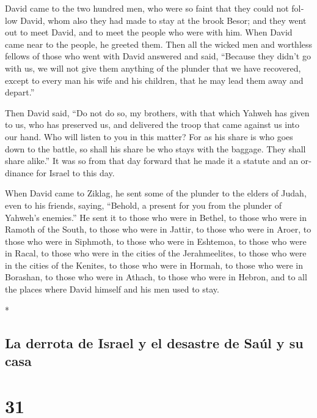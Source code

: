 \begin{paracol}{2}
\begin{otherlanguage}{english}
 David came to the two hundred men, who were so faint
that they could not follow David, whom also they had made to stay at the
brook Besor; and they went out to meet David, and to meet the people who
were with him. When David came near to the people, he greeted them.
 Then all the wicked men and worthless fellows of those
who went with David answered and said, ``Because they didn't go with us,
we will not give them anything of the plunder that we have recovered,
except to every man his wife and his children, that he may lead them
away and depart.''

 Then David said, ``Do not do so, my brothers, with that
which Yahweh has given to us, who has preserved us, and delivered the
troop that came against us into our hand.  Who will
listen to you in this matter? For as his share is who goes down to the
battle, so shall his share be who stays with the baggage. They shall
share alike.''  It was so from that day forward that he
made it a statute and an ordinance for Israel to this day.

 When David came to Ziklag, he sent some of the plunder
to the elders of Judah, even to his friends, saying, ``Behold, a present
for you from the plunder of Yahweh's enemies.''  He sent
it to those who were in Bethel, to those who were in Ramoth of the
South, to those who were in Jattir,  to those who were in
Aroer, to those who were in Siphmoth, to those who were in Eshtemoa,
 to those who were in Racal, to those who were in the
cities of the Jerahmeelites, to those who were in the cities of the
Kenites,  to those who were in Hormah, to those who were
in Borashan, to those who were in Athach,  to those who
were in Hebron, and to all the places where David himself and his men
used to stay.

\end{otherlanguage}

\switchcolumn[0]*

\hypertarget{la-derrota-de-israel-y-el-desastre-de-sauxfal-y-su-casa}{%
\subsection{La derrota de Israel y el desastre de Saúl y su
casa}\label{la-derrota-de-israel-y-el-desastre-de-sauxfal-y-su-casa}}

\hypertarget{section-60}{%
\section{31}\label{section-60}}


\end{paracol}
